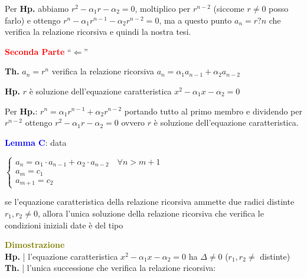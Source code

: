 \begin{flushleft}
\begin{boxA}
        \begin{flushleft}
            Per \textbf{Hp.} abbiamo $r^2 - \alpha_1r - \alpha_2 = 0$, moltiplico per $r^{n-2}$ (siccome $r \neq 0$ posso farlo) e ottengo $r^n - \alpha_1r^{n-1} - \alpha_2r^{n-2} = 0$, ma a questo punto $a_n = r?n$ che verifica la relazione ricorsiva e quindi la nostra tesi.
        \end{flushleft}
        \textcolor{red}{\textbf{Seconda Parte}} ``$\Leftarrow$''

        {\centering
            \begin{minipage}[t]{0.45\textwidth}
                \centering
                \textbf{Th.} $a_n = r^n$ verifica la relazione ricorsiva $a_n = \alpha_1a_{n-1} + \alpha_2a_{n-2}$ \\
            \end{minipage}
            \hfill
            \begin{minipage}[t]{0.45\textwidth}
                \centering
                \textbf{Hp.} $r$ è soluzione dell'equazione caratteristica $x^2 - \alpha_1 x - \alpha_2 = 0$ \\
            \end{minipage}
        \par}
        \begin{flushleft}
            Per \textbf{Hp.}: $r^n = \alpha_1r^{n-1} + \alpha_2r^{n-2}$ portando tutto al primo membro e dividendo per $r^{n-2}$ ottengo $r^2 - \alpha_1r - \alpha_2 = 0$ ovvero $r$ è soluzione dell'equazione caratteristica.
        \end{flushleft}
    \end{boxA}

    \newpage
    \textcolor{blue}{\textbf{Lemma C}}: data

    {\centering
        $\begin{cases}
            a_n = \alpha_1 \cdot a_{n-1} + \alpha_2 \cdot a_{n-2} \quad \forall n > m + 1 \\
            a_m = c_1 \\
            a_{m+1} = c_2
        \end{cases}$
    \par}
    se l'equazione caratteristica della relazione ricorsiva ammette due radici distinte $r_1, r_2 \neq 0$, allora l'unica soluzione della relazione ricorsiva che verifica le condizioni iniziali date è del tipo 
    
    {\centering
    \par}
    \begin{boxA}
        \textcolor{olive}{\textbf{Dimostrazione}} \\
        \textbf{Hp.} | l'equazione caratteristica $x^2 -\alpha_1x - \alpha_2 = 0$ ha $\Delta \neq 0$ ($r_1, r_2 \neq$ distinte) \\
        \textbf{Th.} | l'unica successione che verifica la relazione ricorsiva: 


\end{boxA}
\end{flushleft}
